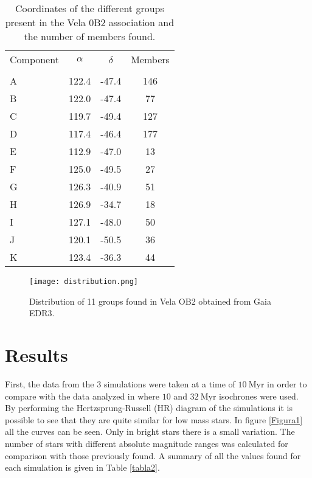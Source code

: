 \documentclass[baaa]{baaa}
\begin{document}
\begin{table}[!t]
\centering
\caption{Coordinates of the different groups present in the Vela 0B2 association and the number of members found.}
\begin{tabular}{lccc}
\hline\hline\noalign{\smallskip}
\!\!Component & \!\!\!\! $\alpha$ & \!\!\!\! $\delta$ & Members  \!\!\!\!\\
\!\! & \!\!\!\! [deg] & \!\!\!\! [deg] &  \!\!\!\!\\
\hline\noalign{\smallskip}
\!\!A  &  122.4 & -47.4 & 146\\
\!\!B& 122.0& -47.4 & 77 \\
\!\!C & 119.7 & -49.4 & 127\\
\!\!D& 117.4 & -46.4 &177 \\
\!\!E  &  112.9 & -47.0 & 13\\
\!\!F& 125.0& -49.5 & 27 \\
\!\!G & 126.3 & -40.9 & 51\\
\!\!H& 126.9 & -34.7 & 18\\
\!\!I& 127.1& -48.0 & 50\\
\!\!J & 120.1 & -50.5 & 36\\
\!\!K& 123.4 & -36.3 & 44\\

\hline
\end{tabular}
\label{tabla1}
\end{table}

\begin{figure}[!t]
\centering
\texttt{[image: distribution.png]}
\caption{Distribution of 11 groups found in Vela OB2 obtained from Gaia EDR3.}
\label{Figura}
\end{figure}

\section{Results}
First, the data from the 3 simulations were taken at a time of $10~\mathrm{Myr}$ in order to compare with the data analyzed in \cite{cantat} where $10$ and $32~\mathrm{Myr}$ isochrones were used.
By performing the Hertzsprung-Russell (HR) diagram of the simulations it is possible to see that they are quite similar for low mass stars. In figure \ref{Figura1} all the curves can be seen. Only in bright stars there is a small variation.
The number of stars with different absolute magnitude ranges was calculated for comparison with those previously found. A summary of all the values found for each simulation is given in Table \ref{tabla2}.
\end{document}
